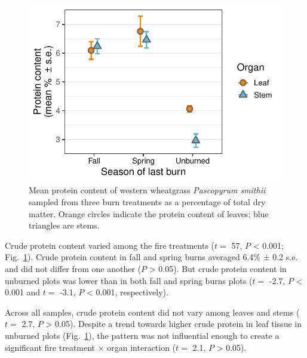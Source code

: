 \documentclass[referee, 
	            sn-basic]
           {sn-jnl}
\begin{document}
\begin{linenumbers}
\begin{figure}
\centering
\includegraphics{value_gg-1.pdf}
\caption{Mean protein content of western wheatgrass \emph{Pascopyrum smithii} sampled from three burn treatments as a percentage of total dry matter. 
Orange circles indicate the protein content of leaves; blue triangles are stems.}
 \label{value} %
\end{figure}

Crude protein content varied among the fire treatments (\(t =\) 57, \(P\) \textless{} 0.001; Fig.~\ref{value}). 
Crude protein content in fall and spring burns averaged 6.4\% ± 0.2 s.e. and did not differ from one another (\(P\) \textgreater{} 0.05). 
But crude protein content in unburned  plots was lower than in both fall and spring burns plots (\(t =\) -2.7, \(P\) \textless{} 0.001 and \(t =\) -3.1, \(P\) \textless{} 0.001, respectively).

Across all samples, crude protein content did not vary among leaves and
stems (\(t =\) 2.7, \(P\) \textgreater{} 0.05). Despite a trend towards
higher crude protein in leaf tissue in unburned plots (Fig.~\ref{value}), the
pattern was not influential enough to create a significant fire
treatment \(\times\) organ interaction (\(t =\) 2.1, \(P\)
\textgreater{} 0.05).


\end{linenumbers}
\end{document}
